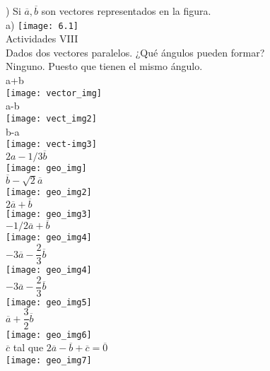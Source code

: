 \documentclass[11pt,a4paper]{article}
\begin{document}
\begin{justify}
) Si $\overline{a}, \overline{b}$ son vectores representados en la figura.\\


\noindent
a) \texttt{[image: 6.1]}\\  
 

\noindent
Actividades VIII\\

\noindent
Dados dos vectores paralelos. ¿Qué ángulos pueden formar?\\

\noindent
Ninguno. Puesto que tienen el mismo ángulo.\\

\noindent
a+b\\
\texttt{[image: vector\_img]}\\

\noindent
a-b\\
\texttt{[image: vect\_img2]}\\

\noindent
b-a\\
\texttt{[image: vect-img3]}\\

\noindent
$2a-1/3 \overline{b}$\\
\texttt{[image: geo\_img]}\\

\noindent
$\overline{b}-\sqrt{2}\overline{a}$\\
\texttt{[image: geo\_img2]}\\

\noindent
$2\overline{a}+\overline{b}$\\
\texttt{[image: geo\_img3]}\\

\noindent
$-1/2 \overline{a}+\overline{b}$\\
\texttt{[image: geo\_img4]}\\

\noindent
$-3\overline{a}-\dfrac{2}{3}\overline{b}$\\
\texttt{[image: geo\_img4]}\\

\noindent
$-3\overline{a}-\dfrac{2}{3}\overline{b}$\\
\texttt{[image: geo\_img5]}\\

\noindent
$\overline{a}+\dfrac{3}{2}\overline{b}$\\
\texttt{[image: geo\_img6]}\\

\noindent
$\overline{c}$ tal que $2\overline{a}-\overline{b}+\overline{c} = \overline{0}$\\
\texttt{[image: geo\_img7]}\\




\end{justify}



\newpage

\nocite{tippens2007fisica}



\end{document}
